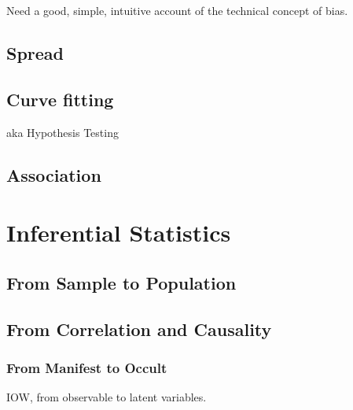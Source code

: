 \begin{ednote}
  Need a good, simple, intuitive account of the technical concept of
  bias.
\end{ednote}

\section{Spread}

\section{Curve fitting}

aka Hypothesis Testing

\section{Association}

\chapter{Inferential Statistics}

\section{From Sample to Population}

\section{From Correlation and Causality}

\subsection{From Manifest to Occult}

IOW, from observable to latent variables.

